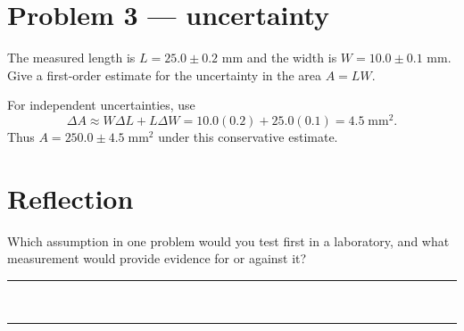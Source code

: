\documentclass[12pt,a4paper]{article}
\begin{document}
\section*{Problem 3 — uncertainty}
\begin{givenbox}
The measured length is $L=25.0\pm0.2$ mm and the width is
$W=10.0\pm0.1$ mm.  Give a first-order estimate for the uncertainty in the
area $A=LW$.
\end{givenbox}
\begin{solutionbox}
For independent uncertainties, use
\[
  \Delta A \approx W\Delta L+L\Delta W
  =10.0(0.2)+25.0(0.1)=4.5\;\mathrm{mm^2}.
\]
Thus $A=250.0\pm4.5\;\mathrm{mm^2}$ under this conservative estimate.
\end{solutionbox}

\section*{Reflection}
Which assumption in one problem would you test first in a laboratory, and what
measurement would provide evidence for or against it?\\[12mm]
\rule{\linewidth}{0.4pt}\\[12mm]
\rule{\linewidth}{0.4pt}
\end{document}
